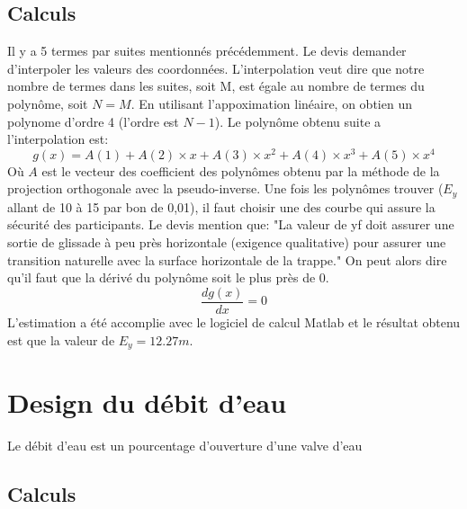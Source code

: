\documentclass[12pt]{article}
\begin{document}
\subsection{Calculs}
Il y a 5 termes par suites mentionnés précédemment. Le devis demander d'interpoler les valeurs des coordonnées. L'interpolation veut dire que notre nombre de termes dans les suites, soit M, est égale au nombre de termes du polynôme, soit $N=M$. En utilisant l'appoximation linéaire, on obtien un polynome d'ordre 4 (l'ordre est $N-1$). Le polynôme obtenu suite a l'interpolation est: 
\begin{equation}
g(x) = A(1) + A(2)\times x + A(3)\times x^2 + A(4)\times x^3 + A(5)\times x^4 
\end{equation}
Où $A$ est le vecteur des coefficient des polynômes obtenu par la méthode de la projection orthogonale avec la pseudo-inverse. 
\newpage
\noindent
Une fois les polynômes trouver ($E_y$ allant de 10 à 15 par bon de 0,01), il faut choisir une des courbe qui assure la sécurité des participants. Le devis mention que: "La valeur de yf doit assurer une sortie de glissade à peu près horizontale (exigence qualitative) pour assurer une transition naturelle avec la surface horizontale de la trappe." On peut alors dire qu'il faut que la dérivé du polynôme soit le plus près de 0. 
\begin{equation}
\frac{dg(x)}{dx} = 0
\end{equation}
L'estimation a été accomplie avec le logiciel de calcul Matlab et le résultat obtenu est que la valeur de $E_y = 12.27m$. 

\section{Design du débit d'eau}
Le débit d'eau est un pourcentage d'ouverture d'une valve d'eau
\subsection{Calculs}
\end{document}
